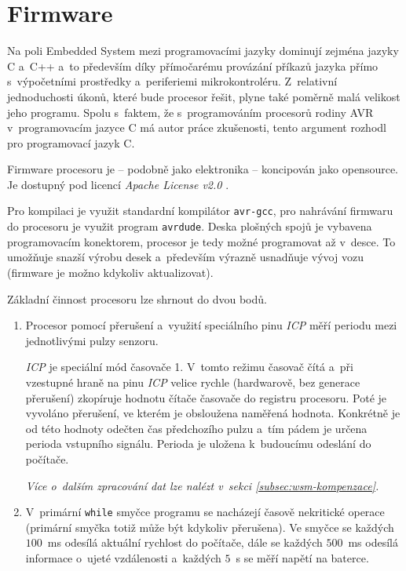 \section{Firmware}
\label{sec:wsm-fw}

Na poli Embedded System mezi programovacími jazyky dominují zejména jazyky C
a~C++ a~to především díky přímočarému provázání příkazů jazyka přímo
s~výpočetními prostředky a~periferiemi mikrokontroléru. Z~relativní
jednoduchosti úkonů, které bude procesor řešit, plyne také poměrně malá
velikost jeho programu. Spolu s~faktem, že s~programováním procesorů rodiny
AVR v~programovacím jazyce C má autor práce zkušenosti, tento argument rozhodl
pro programovací jazyk C.

Firmware procesoru je -- podobně jako elektronika -- koncipován jako
opensource. Je dostupný pod licencí \textit{Apache License v2.0} \cite{wsm-fw}.

Pro kompilaci je využit standardní kompilátor \texttt{avr-gcc}, pro nahrávání
firmwaru do procesoru je využit program \texttt{avrdude}. Deska
plošných spojů je vybavena programovacím konektorem, procesor je tedy možné
programovat až v~desce. To umožňuje snazší výrobu desek a~především výrazně
usnadňuje vývoj vozu (firmware je možno kdykoliv aktualizovat).

Základní činnost procesoru lze shrnout do dvou bodů.

\begin{enumerate}
\item Procesor pomocí přerušení a~využití speciálního pinu \textit{ICP}
měří periodu mezi jednotlivými pulzy senzoru.

\textit{ICP} je speciální mód časovače 1. V~tomto režimu časovač čítá a~při
vzestupné hraně na pinu \textit{ICP} velice rychle (hardwarově, bez generace
přerušení) zkopíruje hodnotu čítače časovače do registru procesoru. Poté je
vyvoláno přerušení, ve kterém je obsloužena naměřená hodnota. Konkrétně je od
této hodnoty odečten čas předchozího pulzu a~tím pádem je určena perioda
vstupního signálu. Perioda je uložena k~budoucímu odeslání do počítače.

\textit{Více o~dalším zpracování dat lze nalézt v~sekci
\ref{subsec:wsm-kompenzace}.}

\item V~primární \texttt{while} smyčce programu se nacházejí časově nekritické
operace (primární smyčka totiž může být kdykoliv přerušena). Ve
smyčce se každých $100$~ms odesílá aktuální rychlost do počítače, dále se každých
$500$~ms odesílá informace o~ujeté vzdálenosti a~každých $5$~s se měří napětí
na baterce.

\end{enumerate}

